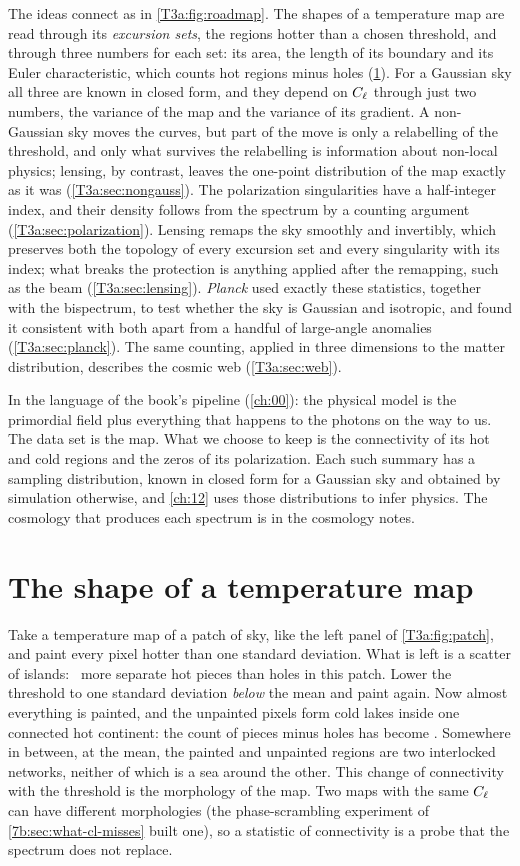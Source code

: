 The ideas connect as in \cref{T3a:fig:roadmap}. The shapes of a temperature map are read through its \emph{excursion sets}, the regions hotter than a chosen threshold, and through three numbers for each set: its area, the length of its boundary and its Euler characteristic, which counts hot regions minus holes (\cref{T3a:sec:morphology}). For a Gaussian sky all three are known in closed form, and they depend on $C_\ell$ through just two numbers, the variance of the map and the variance of its gradient. A non-Gaussian sky moves the curves, but part of the move is only a relabelling of the threshold, and only what survives the relabelling is information about non-local physics; lensing, by contrast, leaves the one-point distribution of the map exactly as it was (\cref{T3a:sec:nongauss}). The polarization singularities have a half-integer index, and their density follows from the spectrum by a counting argument (\cref{T3a:sec:polarization}). Lensing remaps the sky smoothly and invertibly, which preserves both the topology of every excursion set and every singularity with its index; what breaks the protection is anything applied after the remapping, such as the beam (\cref{T3a:sec:lensing}). \textit{Planck} used exactly these statistics, together with the bispectrum, to test whether the sky is Gaussian and isotropic, and found it consistent with both apart from a handful of large-angle anomalies (\cref{T3a:sec:planck}). The same counting, applied in three dimensions to the matter distribution, describes the cosmic web (\cref{T3a:sec:web}).

In the language of the book's pipeline (\cref{ch:00}): the physical model is the primordial field plus everything that happens to the photons on the way to us. The data set is the map. What we choose to keep is the connectivity of its hot and cold regions and the zeros of its polarization. Each such summary has a sampling distribution, known in closed form for a Gaussian sky and obtained by simulation otherwise, and \cref{ch:12} uses those distributions to infer physics. The cosmology that produces each spectrum is in the cosmology notes.
\section{The shape of a temperature map}
\label{T3a:sec:morphology}

Take a temperature map of a patch of sky, like the left panel of \cref{T3a:fig:patch}, and paint every pixel hotter than one standard deviation. What is left is a scatter of islands: \TaChiOne\ more separate hot pieces than holes in this patch. Lower the threshold to one standard deviation \emph{below} the mean and paint again. Now almost everything is painted, and the unpainted pixels form cold lakes inside one connected hot continent: the count of pieces minus holes has become \TaChiMinusOne. Somewhere in between, at the mean, the painted and unpainted regions are two interlocked networks, neither of which is a sea around the other. This change of connectivity with the threshold is the morphology of the map. Two maps with the same $C_\ell$ can have different morphologies (the phase-scrambling experiment of \cref{7b:sec:what-cl-misses} built one), so a statistic of connectivity is a probe that the spectrum does not replace.


